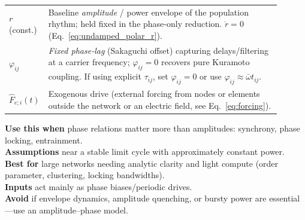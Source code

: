 \documentclass[11pt]{article}
\numberwithin{equation}{section}
\begin{document}
\begin{tcolorbox}
\begin{tabular}{@{}l p{0.9\linewidth}@{}}
\textbf{$r$}(const.) & Baseline \emph{amplitude} / power envelope of the population rhythm; held fixed in the phase‑only reduction. $\dot r=0$ (Eq.~\ref{eq:undamped_polar_r}).\\
\textbf{$\varphi_{ij}$} & \emph{Fixed phase‑lag} (Sakaguchi offset) capturing delays/filtering at a carrier frequency; $\varphi_{ij}=0$ recovers pure Kuramoto coupling. If using explicit $\tau_{ij}$, set $\varphi_{ij}{=}0$ or use $\varphi_{ij}\approx\bar\omega t_{ij}$.\\
\textbf{$\hat F_{e;i}(t)$}& Exogenous drive  (external forcing from nodes or elements outside the network or an electric field, see Eq.~\ref{eq:forcing}). 


\end{tabular}
\end{tcolorbox}

\begin{tcolorbox}[
  colback=gray!5,
  colframe=slate,
  colbacktitle=softblue!25,
  coltitle=softblue!60!black,
  fonttitle=\bfseries\small,
  title={\small When to Use It},
  boxrule=0.4pt,
  enhanced, sharp corners,
  left=4pt,right=4pt,top=3pt,bottom=3pt,
  boxsep=2pt,
  before skip=6pt, after skip=6pt
]
\scriptsize
\textbf{Use this when} phase relations matter more than amplitudes: synchrony, phase locking, entrainment.\\
\textbf{Assumptions} near a stable limit cycle with approximately constant power.\\
\textbf{Best for} large networks needing analytic clarity and light compute (order parameter, clustering, locking bandwidths).\\
\textbf{Inputs} act mainly as phase biases/periodic drives.\\
\textbf{Avoid} if envelope dynamics, amplitude quenching, or bursty power are essential—use an amplitude–phase model.
\end{tcolorbox}
\end{document}
